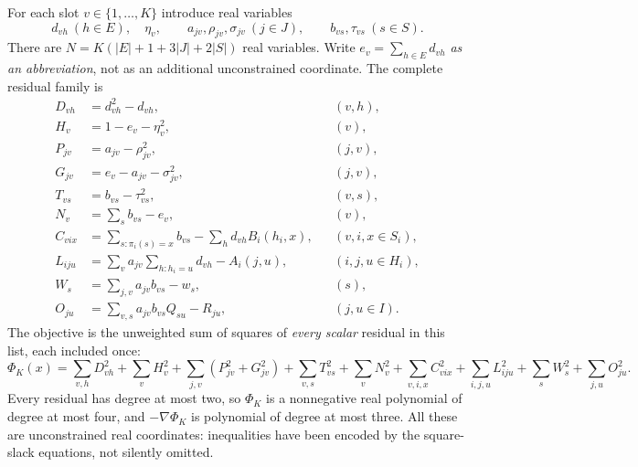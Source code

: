 \documentclass[11pt]{article}
\theoremstyle{remark}
\begin{document}
For each slot $v\in\{1,\ldots,K\}$ introduce real variables
\[
 d_{vh}\ (h\in E),\quad \eta_v,\qquad
 a_{jv},\rho_{jv},\sigma_{jv}\ (j\in J),\qquad
 b_{vs},\tau_{vs}\ (s\in S).
\]
There are $N=K(|E|+1+3|J|+2|S|)$ real variables. Write
$e_v=\sum_{h\in E}d_{vh}$ \emph{as an abbreviation}, not as an additional
unconstrained coordinate. The complete residual family is
\begin{align}
 D_{vh}&=d_{vh}^2-d_{vh}, &&(v,h),\label{eq:poly-selector}\\
 H_v&=1-e_v-\eta_v^2, &&(v),\label{eq:poly-cap}\\
 P_{jv}&=a_{jv}-\rho_{jv}^2, &&(j,v),\label{eq:poly-root-positive}\\
 G_{jv}&=e_v-a_{jv}-\sigma_{jv}^2, &&(j,v),\label{eq:poly-root-gate}\\
 T_{vs}&=b_{vs}-\tau_{vs}^2, &&(v,s),\label{eq:poly-row-positive}\\
 N_v&=\sum_sb_{vs}-e_v, &&(v),\label{eq:poly-row-normalization}\\
 C_{vix}&=\sum_{s:\pi_i(s)=x}b_{vs}
             -\sum_hd_{vh}B_i(h_i,x), &&(v,i,x\in S_i),\label{eq:poly-row-marginal}\\
 L_{iju}&=\sum_va_{jv}\sum_{h:h_i=u}d_{vh}-A_i(j,u),
             &&(i,j,u\in H_i),\label{eq:poly-local-root}\\
 W_s&=\sum_{j,v}a_{jv}b_{vs}-w_s, &&(s),\label{eq:poly-retained}\\
 O_{ju}&=\sum_{v,s}a_{jv}b_{vs}Q_{su}-R_{ju}, &&(j,u\in I).
             \label{eq:poly-observed}
\end{align}
The objective is the unweighted sum of squares of \emph{every scalar}
residual in this list, each included once:
\begin{equation}\label{eq:poly-objective}
 \Phi_K(x)=\sum_{v,h}D_{vh}^2+\sum_vH_v^2
 +\sum_{j,v}(P_{jv}^2+G_{jv}^2)+\sum_{v,s}T_{vs}^2
 +\sum_vN_v^2+\sum_{v,i,x}C_{vix}^2
 +\sum_{i,j,u}L_{iju}^2+\sum_sW_s^2+\sum_{j,u}O_{ju}^2.
\end{equation}
Every residual has degree at most two, so $\Phi_K$ is a nonnegative real
polynomial of degree at most four, and $-\nabla\Phi_K$ is polynomial of degree
at most three. All these are unconstrained real coordinates: inequalities
have been encoded by the square-slack equations, not silently omitted.
\end{document}
